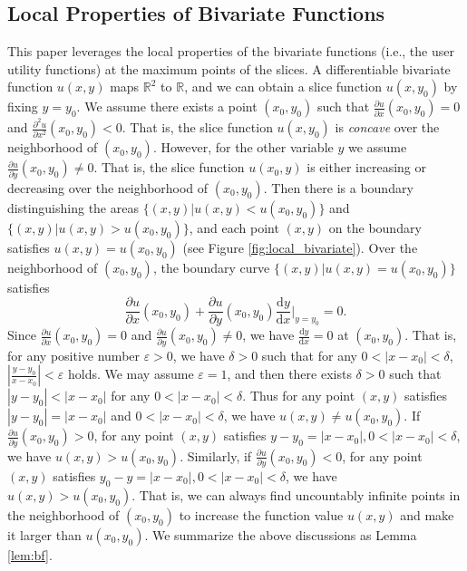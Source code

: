 \documentclass[conference]{IEEEtran}
\theoremstyle{definition}
\begin{document}
\subsection{Local Properties of Bivariate Functions}
This paper leverages the local properties of the bivariate functions (i.e., the user utility functions) at the maximum points of the slices. A differentiable bivariate function $u(x,y)$ maps $\mathbb{R}^2$ to $\mathbb{R}$, and we can obtain a slice function $u(x,y_0)$ by fixing $y=y_0$. We assume there exists a point $(x_0,y_0)$ such that $\frac{\partial u}{\partial x}(x_0,y_0)=0$ and $\frac{\partial^2 u}{\partial x^2}(x_0,y_0)<0$. That is, the slice function $u(x,y_0)$ is \emph{concave} over the neighborhood of $(x_0,y_0)$. However, for the other variable $y$ we assume $\frac{\partial u}{\partial y}(x_0,y_0)\not=0$. That is, the slice function $u(x_0,y)$ is either increasing or decreasing over the neighborhood of $(x_0,y_0)$. Then there is a boundary distinguishing the areas $\{(x,y)|u(x,y)<u(x_0,y_0)\}$ and $\{(x,y)|u(x,y)>u(x_0,y_0)\}$, and each point $(x,y)$ on the boundary satisfies $u(x,y)=u(x_0,y_0)$ (see Figure \ref{fig:local_bivariate}). Over the neighborhood of $(x_0,y_0)$, the boundary curve $\{(x,y)|u(x,y)=u(x_0,y_0)\}$ satisfies
\begin{equation}
\frac{\partial u}{\partial x}(x_0,y_0)+\frac{\partial u}{\partial y}(x_0,y_0)\frac{\mathrm{d} y}{\mathrm{d} x}\bigg|_{y=y_0}=0.
\end{equation}
Since $\frac{\partial u}{\partial x}(x_0,y_0)=0$ and $\frac{\partial u}{\partial y}(x_0,y_0)\not=0$, we have $\frac{\mathrm{d} y}{\mathrm{d} x} = 0$ at $(x_0,y_0)$. That is, for any positive number $\varepsilon>0$, we have $\delta>0$ such that for any $0<|x-x_0|<\delta$, $|\frac{y-y_0}{x-x_0}|<\varepsilon$ holds. We may assume $\varepsilon=1$, and then there exists $\delta>0$ such that $|y-y_0|<|x-x_0|$ for any $0<|x-x_0|<\delta$. Thus for any point $(x,y)$ satisfies $|y-y_0|=|x-x_0|$ and $0<|x-x_0|<\delta$, we have $u(x,y)\not=u(x_0,y_0)$. If $\frac{\partial u}{\partial y}(x_0,y_0)>0$, for any point $(x,y)$ satisfies $y-y_0=|x-x_0|,0<|x-x_0|<\delta$, we have $u(x,y)>u(x_0,y_0)$. Similarly, if $\frac{\partial u}{\partial y}(x_0,y_0)<0$, for any point $(x,y)$ satisfies $y_0-y=|x-x_0|,0<|x-x_0|<\delta$, we have $u(x,y)>u(x_0,y_0)$. That is, we can always find uncountably infinite points in the neighborhood of $(x_0,y_0)$ to increase the function value $u(x,y)$ and make it larger than $u(x_0, y_0)$. We summarize the above discussions as Lemma \ref{lem:bf}.
\end{document}
